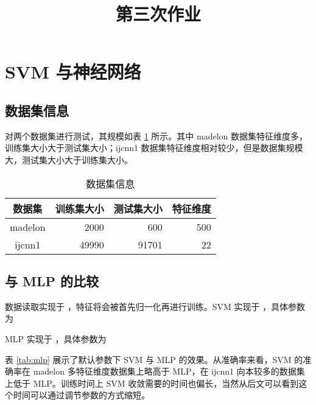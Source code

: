 
    \title{第三次作业}
    \maketitle
    \section{SVM 与神经网络}

    \subsection{数据集信息}

    对两个数据集进行测试，其规模如表 \ref{tab:dataset} 所示。其中 madelon 数据集特征维度多，训练集大小大于测试集大小；ijcnn1 数据集特征维度相对较少，但是数据集规模大，测试集大小大于训练集大小。

    \begin{table}[ht]
        \centering
        \caption{数据集信息}\label{tab:dataset}
        \begin{tabular}{crrr}
            \toprule
            数据集   & 训练集大小 & 测试集大小 & 特征维度 \\
            \midrule
            madelon & 2000 & 600 & 500 \\
            ijcnn1 & 49990 & 91701 & 22 \\
            \bottomrule
        \end{tabular}
    \end{table}

    \subsection{与 MLP 的比较}

    数据读取实现于 ，特征将会被首先归一化再进行训练。SVM 实现于 ，具体参数为
    
    
    MLP 实现于 ，具体参数为
    
    
    表 \ref{tab:mlp} 展示了默认参数下 SVM 与 MLP 的效果。从准确率来看，SVM 的准确率在 madelon 多特征维度数据集上略高于 MLP，在 ijcnn1 向本较多的数据集上低于 MLP。训练时间上 SVM 收敛需要的时间也偏长，当然从后文可以看到这个时间可以通过调节参数的方式缩短。
    
